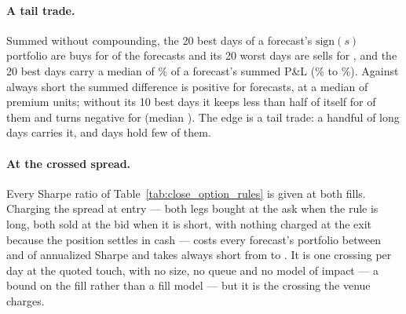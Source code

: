 \paragraph{A tail trade.} Summed without compounding, the 20 best days of a forecast's %
$\mathrm{sign}(s)$ portfolio are buys for \cmMasterTopTwentyBuysN{} of the
\cmMasterPosTotalN{} forecasts and its 20 worst days are sells for
\cmMasterBottomTwentySellsN, and the 20 best days carry a median of
\cmMasterTopTwentyShareMed\% of a forecast's summed P\&L (\cmMasterTopTwentyShareMin\% to
\cmMasterTopTwentyShareMax\%). Against always short the summed difference is positive for
\cmMasterDiffPosN{} forecasts, at a median of \cmMasterDiffMed{} premium units; without its
10 best days it keeps less than half of itself for \cmMasterDiffExTenHalfN{} of them and
turns negative for \cmMasterDiffExTenNegN{} (median \cmMasterDiffExTenMed). The edge is a
tail trade: a handful of long days carries it, and \cmNdays{} days hold few of them.

\paragraph{At the crossed spread.} Every Sharpe ratio of
Table~\ref{tab:close_option_rules} is given at both fills. Charging the
spread at entry --- both legs bought at the ask when the rule is long, both
sold at the bid when it is short, with nothing charged at the exit because
the position settles in cash --- costs every forecast's portfolio between
\cmXLossMin{} and \cmXLossMax{} of annualized Sharpe and takes always short %
from \cmShortShMid{} to \cmShortShX{}. It is one crossing per day at the
quoted touch, with no size, no queue and no model of impact --- a bound on
the fill rather than a fill model --- but it is the crossing the venue
charges.


